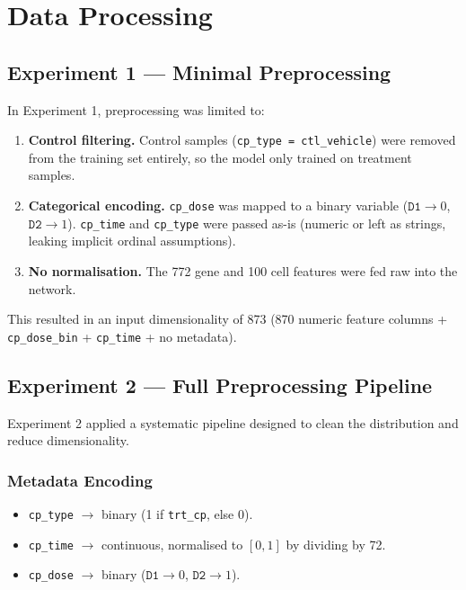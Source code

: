 \documentclass[12pt, a4paper]{article}
\begin{document}
\section{Data Processing}

\subsection{Experiment 1 — Minimal Preprocessing}

In Experiment 1, preprocessing was limited to:

\begin{enumerate}[noitemsep]
    \item \textbf{Control filtering.} Control samples (\texttt{cp\_type = ctl\_vehicle}) were removed from the training set entirely, so the model only trained on treatment samples.
    \item \textbf{Categorical encoding.} \texttt{cp\_dose} was mapped to a binary variable ($\texttt{D1} \to 0$, $\texttt{D2} \to 1$). \texttt{cp\_time} and \texttt{cp\_type} were passed as-is (numeric or left as strings, leaking implicit ordinal assumptions).
    \item \textbf{No normalisation.} The 772 gene and 100 cell features were fed raw into the network.
\end{enumerate}

This resulted in an input dimensionality of 873 (870 numeric feature columns + \texttt{cp\_dose\_bin} + \texttt{cp\_time} + no metadata).

\subsection{Experiment 2 — Full Preprocessing Pipeline}

Experiment 2 applied a systematic pipeline designed to clean the distribution and reduce dimensionality.

\subsubsection{Metadata Encoding}

\begin{itemize}[noitemsep]
    \item \texttt{cp\_type} $\to$ binary (1 if \texttt{trt\_cp}, else 0).
    \item \texttt{cp\_time} $\to$ continuous, normalised to $[0, 1]$ by dividing by 72.
    \item \texttt{cp\_dose} $\to$ binary ($\texttt{D1} \to 0$, $\texttt{D2} \to 1$).
\end{itemize}
\end{document}
